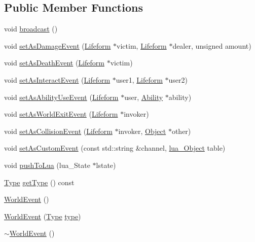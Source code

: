 \subsection*{Public Member Functions}
\begin{DoxyCompactItemize}
\item 
void \hyperlink{classZeta_1_1WorldEvent_a80eaba833d7b3a51c43c23e4be64a01f}{broadcast} ()
\item 
void \hyperlink{classZeta_1_1WorldEvent_a99dd6dbb749c49512b51737c29e44bd6}{set\+As\+Damage\+Event} (\hyperlink{classZeta_1_1Lifeform}{Lifeform} $\ast$victim, \hyperlink{classZeta_1_1Lifeform}{Lifeform} $\ast$dealer, unsigned amount)
\item 
void \hyperlink{classZeta_1_1WorldEvent_aa21286b7c3746bd48615532915d072fa}{set\+As\+Death\+Event} (\hyperlink{classZeta_1_1Lifeform}{Lifeform} $\ast$victim)
\item 
void \hyperlink{classZeta_1_1WorldEvent_a1e107c9042ff59ac7940c21722ce5b9d}{set\+As\+Interact\+Event} (\hyperlink{classZeta_1_1Lifeform}{Lifeform} $\ast$user1, \hyperlink{classZeta_1_1Lifeform}{Lifeform} $\ast$user2)
\item 
void \hyperlink{classZeta_1_1WorldEvent_ac127950f8b62c905c31816619edef2e9}{set\+As\+Ability\+Use\+Event} (\hyperlink{classZeta_1_1Lifeform}{Lifeform} $\ast$user, \hyperlink{classZeta_1_1Ability}{Ability} $\ast$ability)
\item 
void \hyperlink{classZeta_1_1WorldEvent_af8ff7519a3e57679765b316a42c2b1e4}{set\+As\+World\+Exit\+Event} (\hyperlink{classZeta_1_1Lifeform}{Lifeform} $\ast$invoker)
\item 
void \hyperlink{classZeta_1_1WorldEvent_a99a76018a510e85422b6bddef7aa3108}{set\+As\+Collision\+Event} (\hyperlink{classZeta_1_1Lifeform}{Lifeform} $\ast$invoker, \hyperlink{classZeta_1_1Object}{Object} $\ast$other)
\item 
void \hyperlink{classZeta_1_1WorldEvent_a7e168db7b20e4307712a9371c14b637b}{set\+As\+Custom\+Event} (const std\+::string \&channel, \hyperlink{ZetaConfig_8hpp_ae7be32b73848041a60f2412f72bbb221}{lua\+\_\+\+Object} table)
\item 
void \hyperlink{classZeta_1_1WorldEvent_a4896beb135bfca13676d749d40b5f9d9}{push\+To\+Lua} (lua\+\_\+\+State $\ast$lstate)
\item 
\hyperlink{classZeta_1_1WorldEvent_a92adb82c22c6f59afec5911098f85158}{Type} \hyperlink{classZeta_1_1WorldEvent_ac96c18b43e75af4bf37b49f93bd42f92}{get\+Type} () const 
\item 
\hyperlink{classZeta_1_1WorldEvent_ac5f6eb48fe8443c361b4e6294b8d77d2}{World\+Event} ()
\item 
\hyperlink{classZeta_1_1WorldEvent_afc72f9c59b62905af62d72a3d7508d2b}{World\+Event} (\hyperlink{classZeta_1_1WorldEvent_a92adb82c22c6f59afec5911098f85158}{Type} \hyperlink{classZeta_1_1WorldEvent_a67ce954f9d4c03e0525640125068dfef}{type})
\item 
\hyperlink{classZeta_1_1WorldEvent_a8bcb2ac614cd7ad85f8f23f2f0305960}{$\sim$\+World\+Event} ()
\end{DoxyCompactItemize}
